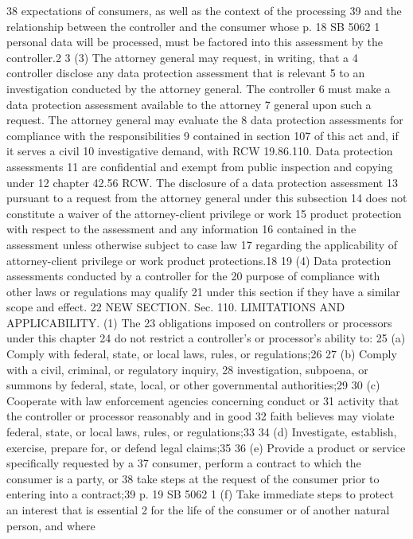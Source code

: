 38 expectations of consumers, as well as the context of the processing
39 and the relationship between the controller and the consumer whose
p. 18 SB 5062
1 personal data will be processed, must be factored into this
assessment by the controller.2
3 (3) The attorney general may request, in writing, that a
4 controller disclose any data protection assessment that is relevant
5 to an investigation conducted by the attorney general. The controller
6 must make a data protection assessment available to the attorney
7 general upon such a request. The attorney general may evaluate the
8 data protection assessments for compliance with the responsibilities
9 contained in section 107 of this act and, if it serves a civil
10 investigative demand, with RCW 19.86.110. Data protection assessments
11 are confidential and exempt from public inspection and copying under
12 chapter 42.56 RCW. The disclosure of a data protection assessment
13 pursuant to a request from the attorney general under this subsection
14 does not constitute a waiver of the attorney-client privilege or work
15 product protection with respect to the assessment and any information
16 contained in the assessment unless otherwise subject to case law
17 regarding the applicability of attorney-client privilege or work
product protections.18
19 (4) Data protection assessments conducted by a controller for the
20 purpose of compliance with other laws or regulations may qualify
21 under this section if they have a similar scope and effect.
22 NEW SECTION. Sec. 110. LIMITATIONS AND APPLICABILITY. (1) The
23 obligations imposed on controllers or processors under this chapter
24 do not restrict a controller's or processor's ability to:
25 (a) Comply with federal, state, or local laws, rules, or
regulations;26
27 (b) Comply with a civil, criminal, or regulatory inquiry,
28 investigation, subpoena, or summons by federal, state, local, or
other governmental authorities;29
30 (c) Cooperate with law enforcement agencies concerning conduct or
31 activity that the controller or processor reasonably and in good
32 faith believes may violate federal, state, or local laws, rules, or
regulations;33
34 (d) Investigate, establish, exercise, prepare for, or defend
legal claims;35
36 (e) Provide a product or service specifically requested by a
37 consumer, perform a contract to which the consumer is a party, or
38 take steps at the request of the consumer prior to entering into a
contract;39
p. 19 SB 5062
1 (f) Take immediate steps to protect an interest that is essential
2 for the life of the consumer or of another natural person, and where
